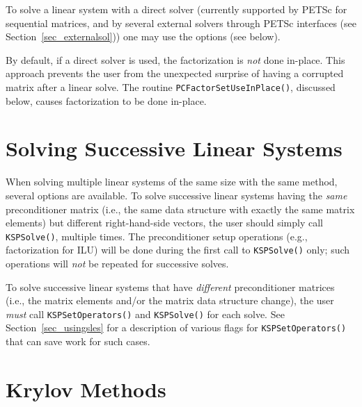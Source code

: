 To solve a linear system with a direct solver (currently supported
by PETSc for sequential matrices, and by several external solvers through
PETSc interfaces (see Section~\ref{sec_externalsol})) one may use the options
   
(see below).

By default, if a direct solver is used, the factorization is {\em not} done
in-place. This approach prevents the user from the unexpected surprise
of having a corrupted matrix after a linear solve. The routine
\lstinline{PCFactorSetUseInPlace()}, discussed below, causes factorization to
be done in-place.

\section{Solving Successive Linear Systems}

When solving multiple linear systems of the same size with the same
method, several options are available.  To solve successive linear
systems having the {\em same} preconditioner matrix (i.e., the same
data structure with exactly the same matrix elements) but different
right-hand-side vectors, the user should simply call \lstinline{KSPSolve()},
multiple times.  The preconditioner setup operations (e.g.,
factorization for ILU) will be done during the first call to \lstinline{KSPSolve()} only; such operations will {\em not} be repeated for
successive solves.

To solve successive linear systems that have {\em different}
preconditioner matrices (i.e., the matrix elements and/or the matrix
data structure change), the user {\em must} call
\lstinline{KSPSetOperators()} and \lstinline{KSPSolve()} for each solve.  See
Section~\ref{sec_usingsles} for a description of various flags for
\lstinline{KSPSetOperators()} that can save work for such cases.

\section{Krylov Methods}
\label{sec_ksp}

